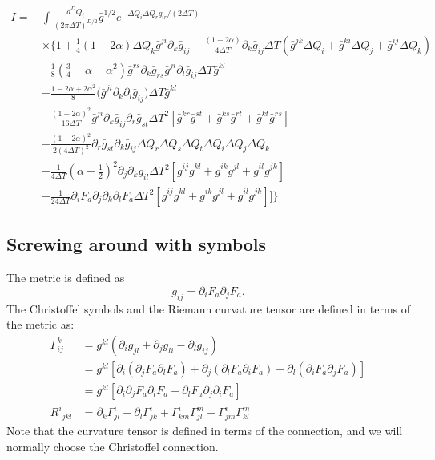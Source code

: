 \begin{align}
I=\,&\int \frac{d^DQ_i}{(2\pi \Delta T)^{D/2}}\bar{g}^{1/2}e^{-\Delta Q_i \Delta Q_rg_{ir}/(2\Delta T)} \nonumber\\
&\times\bigg\{1+\frac{1}{4}(1-2\alpha)\Delta Q_k \bar{g}^{ji}\partial_k\bar{g}_{ij}
-\frac{(1-2\alpha)}{4\Delta T}\partial_k\bar{g}_{ij}\Delta T
(\bar{g}^{jk}\Delta Q_i+\bar{g}^{ki}\Delta Q_j+\bar{g}^{ij}\Delta Q_k)\nonumber\\
&
-\frac{1}{8}\left(\frac{3}{4}-\alpha+\alpha^2\right)
\bar{g}^{rs}\partial_k\bar{g}_{rs}\bar{g}^{ji}\partial_l\bar{g}_{ij}\Delta T \bar{g}^{kl} \nonumber\\
&+ \frac{1-2\alpha+2\alpha^2}{8}\big(\bar{g}^{ji}\partial_k\partial_l\bar{g}_{ij}
\big)\Delta T \bar{g}^{kl}
\nonumber\\
&
-\frac{(1-2\alpha)^2}{16\Delta T} \bar{g}^{ji}\partial_k\bar{g}_{ij}
\partial_r\bar{g}_{st}\Delta T^2\left[\bar{g}^{kr}\bar{g}^{st} +\bar{g}^{ks}\bar{g}^{rt}+\bar{g}^{kt}\bar{g}^{rs} \right] \nonumber\\
%
&-\frac{(1-2\alpha)^2}{2(4\Delta T)^2}\partial_r\bar{g}_{st}\partial_k\bar{g}_{ij}
\Delta Q_r \Delta Q_s\Delta Q_t\Delta Q_i \Delta Q_j\Delta Q_k  \nonumber\\%
&-\frac{1}{4\Delta T}\left(\alpha-\frac{1}{2}\right)^2\partial_j\partial_k\bar{g}_{il}
\Delta T^2[ \bar{g}^{ij}\bar{g}^{kl} + \bar{g}^{ik}\bar{g}^{jl}+\bar{g}^{il}\bar{g}^{jk}]\nonumber\\ %
&-\frac{1}{24\Delta T}\partial_i F_a \partial_j\partial_k\partial_lF_a
\Delta T^2[ \bar{g}^{ij}\bar{g}^{kl} + \bar{g}^{ik}\bar{g}^{jl}+\bar{g}^{il}\bar{g}^{jk}]
\big]\bigg\}  %
\end{align}

\subsection{Screwing around with symbols}

The metric is defined as
\begin{equation}
g_{ij} =\partial_iF_a\partial_jF_a.
\end{equation}
The Christoffel symbols and the Riemann curvature tensor are defined in terms
of the metric as:
\begin{align}
\Gamma_{ij}^k &= g^{kl}(\partial_ig_{jl}+\partial_jg_{li}-\partial_lg_{ij})\\
&= g^{kl}[\partial_i(\partial_j F_a\partial_lF_a)+\partial_j(\partial_lF_a\partial_iF_a)
-\partial_l(\partial_iF_a\partial_jF_a)]\\
&= g^{kl}[\partial_i\partial_j F_a\partial_lF_a+\partial_lF_a\partial_j\partial_iF_a]\\
%
{R^{i}}_{jkl} &=\partial_k\Gamma_{jl}^i-\partial_l\Gamma_{jk}^i
+\Gamma^i_{km}\Gamma^{m}_{jl}-\Gamma^i_{jm}\Gamma^m_{kl}
\end{align}
Note that the curvature tensor is defined in terms of the connection, and we
will normally choose the Christoffel connection.  

